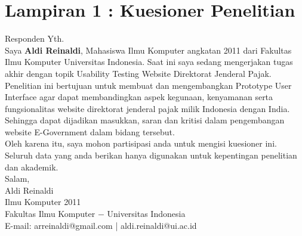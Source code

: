 \chapter*{Lampiran 1 : Kuesioner Penelitian}
Responden Yth.\\
Saya \textbf{Aldi Reinaldi}, Mahasiswa Ilmu Komputer angkatan 2011 dari Fakultas Ilmu Komputer Universitas Indonesia. Saat ini saya sedang mengerjakan tugas akhir dengan topik Usability Testing Website Direktorat Jenderal Pajak. Penelitian ini bertujuan untuk membuat dan mengembangkan Prototype User Interface agar dapat membandingkan aspek kegunaan, kenyamanan serta fungsionalitas website direktorat jenderal pajak milik Indonesia dengan India. Sehingga dapat dijadikan masukkan, saran dan kritisi dalam pengembangan website E-Government dalam bidang tersebut.
\newline\\
Oleh karena itu, saya mohon partisipasi anda untuk mengisi kuesioner ini. Seluruh data yang anda berikan hanya digunakan untuk kepentingan penelitian dan akademik.
\newline\\
Salam,\\
Aldi Reinaldi\\
Ilmu Komputer 2011\\
Fakultas Ilmu Komputer $-$ Universitas Indonesia\\
E-mail: arreinaldi@gmail.com | aldi.reinaldi@ui.ac.id


\begin{landscape}


\end{landscape}



